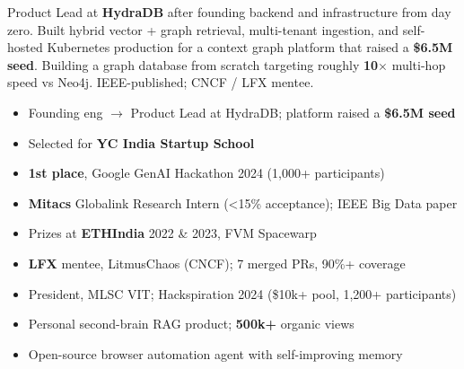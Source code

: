 \small
Product Lead at \textbf{HydraDB} after founding backend and infrastructure from day zero. Built hybrid vector + graph retrieval, multi-tenant ingestion, and self-hosted Kubernetes production for a context graph platform that raised a \textbf{\$6.5M seed}. Building a graph database from scratch targeting roughly \textbf{10$\times$} multi-hop speed vs Neo4j. IEEE-published; CNCF / LFX mentee.
\medskip


\medskip
{}
\begin{itemize}
  \item Founding eng $\rightarrow$ Product Lead at HydraDB; platform raised a \textbf{\$6.5M seed}
  \item Selected for \textbf{YC India Startup School}
  \item \textbf{1st place}, Google GenAI Hackathon 2024 (1,000+ participants)
  \item \textbf{Mitacs} Globalink Research Intern (\textless15\% acceptance); IEEE Big Data paper
  \item Prizes at \textbf{ETHIndia} 2022 \& 2023, FVM Spacewarp
  \item \textbf{LFX} mentee, LitmusChaos (CNCF); 7 merged PRs, 90\%+ coverage
  \item President, MLSC VIT; Hackspiration 2024 (\$10k+ pool, 1,200+ participants)
\end{itemize}

\medskip
{}
\begin{itemize}
  \item Personal second-brain RAG product; \textbf{500k+} organic views
\end{itemize}
\vspace{-0.3em}

\begin{itemize}
  \item Open-source browser automation agent with self-improving memory
\end{itemize}
\vspace{-0.3em}

